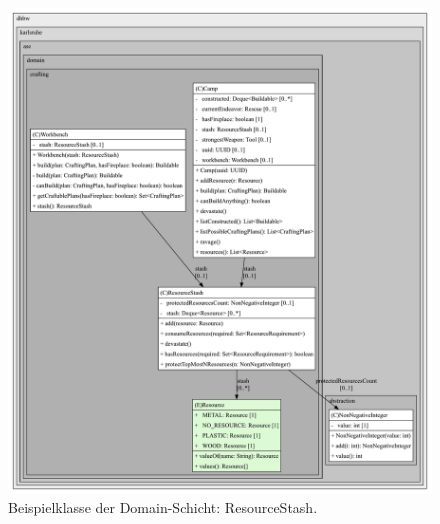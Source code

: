 \begin{figure}[H]
	\centering
	\includegraphics[width=1.05\textwidth]{Bilder/ResourceStash_structure.pdf} 
	\caption{Beispielklasse der Domain-Schicht: ResourceStash.}
	\label{fig:layer-ResourceStash}
\end{figure} 